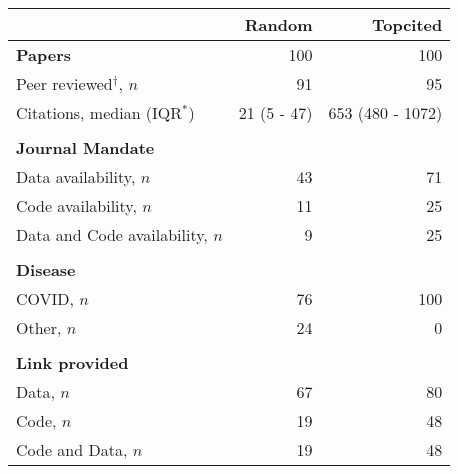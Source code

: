 \begin{tabular}{l|rr}
  \hline
 & Random & Topcited \\ 
  \hline
\textbf{Papers} & 100 & 100 \\ 
  \hspace{5mm}Peer reviewed$^\dag$, $n$ & 91 & 95 \\ 
  \hspace{5mm}Citations, median (IQR$^*$) & 21 (5 - 47) & 653 (480 - 1072) \\ 
   &  &  \\ 
  \textbf{Journal Mandate} &  &  \\ 
  \hspace{5mm}Data availability, $n$ & 43 & 71 \\ 
  \hspace{5mm}Code availability, $n$ & 11 & 25 \\ 
  \hspace{5mm}Data and Code availability, $n$ & 9 & 25 \\ 
    &  &  \\ 
  \textbf{Disease} &  &  \\ 
  \hspace{5mm}COVID, $n$ & 76 & 100 \\ 
  \hspace{5mm}Other, $n$ & 24 & 0 \\ 
     &  &  \\ 
  \textbf{Link provided} &  &  \\ 
  \hspace{5mm}Data, $n$ & 67 & 80 \\ 
  \hspace{5mm}Code, $n$ & 19 & 48 \\ 
  \hspace{5mm}Code and Data, $n$ & 19 & 48 \\ 
   \hline
\end{tabular}
